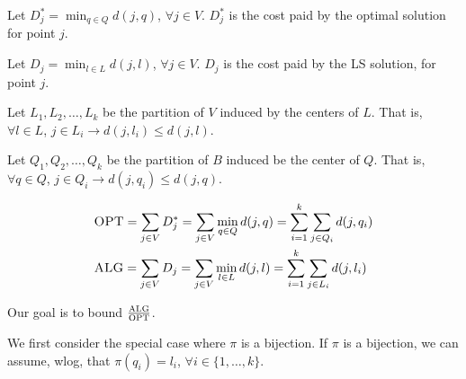     Let $D_j^* = \min_{q \in Q} d(j,q)$, $\forall j \in V$. $D_j^*$ is the cost paid by the optimal solution for point $j$.

    Let $D_j = \min_{l \in L} d(j,l)$, $\forall j \in V$. $D_j$ is the cost paid by the LS solution, for point $j$.

    Let $L_1, L_2, \dots, L_k$ be the partition of $V$ induced by the centers of $L$.
    That is, $\forall l \in L$, $j \in L_i \rightarrow d(j,l_i) \leq d(j,l)$.

    Let $Q_1, Q_2, \dots, Q_k$ be the partition of $B$ induced be the center of $Q$.
    That is, $\forall q \in Q$, $j \in Q_i \rightarrow d(j,q_i) \leq d(j,q)$.

    \begin{equation*}
        \begin{split}
            &\textsc{OPT} = \sum_{j \in V} D_j^* = \sum_{j \in V} \min_{q \in Q} d(j,q) = \sum_{i=1}^{k} \sum_{j \in Q_i} d(j,q_i)\\
            &\textsc{ALG} = \sum_{j \in V} D_j = \sum_{j \in V} \min_{l \in L} d(j,l) = \sum_{i=1}^{k} \sum_{j \in L_i} d(j,l_i)
        \end{split}
    \end{equation*}

    Our goal is to bound $\frac{\textsc{ALG}}{\textsc{OPT}}$.

    We first consider the special case where $\pi$ is a bijection.
    If $\pi$ is a bijection, we can assume, wlog, that $\pi(q_i) = l_i$, $\forall i \in \{ 1, \dots, k \}$.